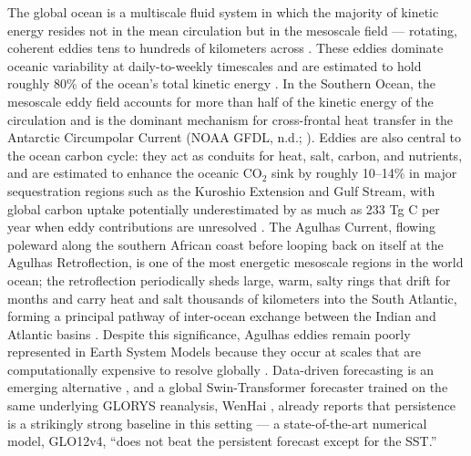 \documentclass[11pt]{article}
\begin{document}
The global ocean is a multiscale fluid system in which the majority of kinetic energy resides not in the mean circulation but in the mesoscale field --- rotating, coherent eddies tens to hundreds of kilometers across \citep[]{FerrariWunsch2009}. These eddies dominate oceanic variability at daily-to-weekly timescales and are estimated to hold roughly 80\% of the ocean's total kinetic energy \citep[]{Garabato2022}. In the Southern Ocean, the mesoscale eddy field accounts for more than half of the kinetic energy of the circulation and is the dominant mechanism for cross-frontal heat transfer in the Antarctic Circumpolar Current (NOAA GFDL, n.d.; \citealp{Gray2024}). Eddies are also central to the ocean carbon cycle: they act as conduits for heat, salt, carbon, and nutrients, and are estimated to enhance the oceanic CO$_2$ sink by roughly 10--14\% in major sequestration regions such as the Kuroshio Extension and Gulf Stream, with global carbon uptake potentially underestimated by as much as 233 Tg C per year when eddy contributions are unresolved \citep[]{Li2025}. The Agulhas Current, flowing poleward along the southern African coast before looping back on itself at the Agulhas Retroflection, is one of the most energetic mesoscale regions in the world ocean; the retroflection periodically sheds large, warm, salty rings that drift for months and carry heat and salt thousands of kilometers into the South Atlantic, forming a principal pathway of inter-ocean exchange between the Indian and Atlantic basins \citep[]{Lutjeharms2007,Zhu2021}. Despite this significance, Agulhas eddies remain poorly represented in Earth System Models because they occur at scales that are computationally expensive to resolve globally \citep[]{Smith2023}. Data-driven forecasting is an emerging alternative \citep[]{Heimbach2024}, and a global Swin-Transformer forecaster trained on the same underlying GLORYS reanalysis, WenHai \citep[]{Cui2025}, already reports that persistence is a strikingly strong baseline in this setting --- a state-of-the-art numerical model, GLO12v4, ``does not beat the persistent forecast except for the SST.''
\end{document}
